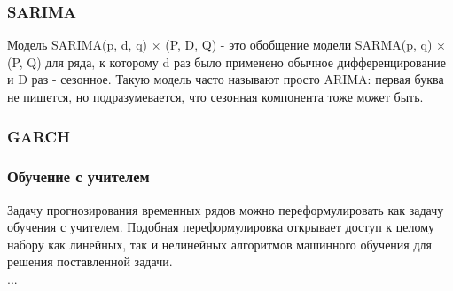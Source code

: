 \subsubsection{SARIMA}

Модель SARIMA(p, d, q) $\times$ (P, D, Q) - это обобщение модели SARMA(p, q) $\times$ (P, Q) для ряда, 
к которому d раз было применено обычное дифференцирование и D раз - сезонное. 
Такую модель часто называют просто ARIMA:
первая буква не пишется, но подразумевается, что сезонная компонента тоже может быть.

\subsubsection{GARCH}


\subsubsection{Обучение с учителем}

Задачу прогнозирования временных рядов можно переформулировать как 
задачу обучения с учителем. Подобная переформулировка открывает 
доступ к целому набору как линейных, так и нелинейных алгоритмов 
машинного обучения для решения поставленной задачи. \\

...







